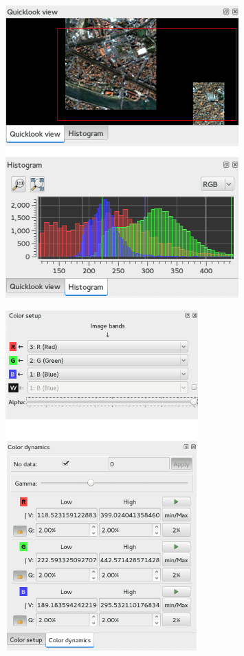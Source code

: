 \begin{figure}[!h] 
  \center
  \includegraphics[width=0.8\textwidth]{../Art/MonteverdiImages/quickhisto.png}
  \label{fig:quickhisto}
\end{figure}

\begin{figure}[!h] 
  \center
  \includegraphics[width=0.66\textwidth]{../Art/MonteverdiImages/colsetdyn.png}
  \label{fig:colorsetdyn}
\end{figure}



